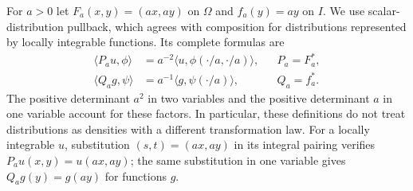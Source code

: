 For $a>0$ let $F_a(x,y)=(ax,ay)$ on $\Omega$ and
$f_a(y)=ay$ on $I$. We use scalar-distribution pullback, which agrees
with composition for distributions represented by locally integrable
functions. Its complete formulas are
\begin{equation}\tag{SDB18}\label{eq:SDB-pullback}
 \begin{aligned}
 \langle P_a u,\phi\rangle
   &=a^{-2}\langle u,\phi(\cdot/a,\cdot/a)\rangle,
        &&P_a=F_a^*,\\
 \langle Q_a g,\psi\rangle
   &=a^{-1}\langle g,\psi(\cdot/a)\rangle,
        &&Q_a=f_a^*.
 \end{aligned}
\end{equation}
The positive determinant $a^2$ in two variables and the positive
determinant $a$ in one variable account for these factors. In
particular, these definitions do not treat distributions as densities
with a different transformation law.
For a locally integrable $u$, substitution $(s,t)=(ax,ay)$ in its
integral pairing verifies $P_a u(x,y)=u(ax,ay)$; the same substitution
in one variable gives $Q_a g(y)=g(ay)$ for functions $g$.

